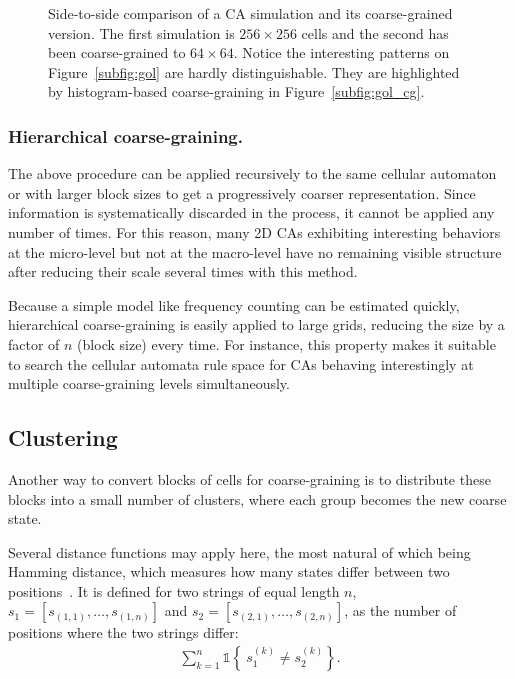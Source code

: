 \begin{figure}[th]
  \caption{\label{fig:gol_comparison} Side-to-side comparison of a CA simulation
    and its coarse-grained version. The first simulation is $256 \times 256$
    cells and the second has been coarse-grained to $64\times 64$. Notice the
    interesting patterns on Figure~\ref{subfig:gol} are hardly distinguishable.
    They are highlighted by histogram-based coarse-graining in
    Figure~\ref{subfig:gol_cg}.}
\end{figure}


\subsubsection{Hierarchical coarse-graining.}
The above procedure can be applied recursively to the same cellular automaton or
with larger block sizes to get a progressively coarser representation. Since
information is systematically discarded in the process, it cannot be applied any
number of times. For this reason, many 2D CAs exhibiting interesting behaviors at
the micro-level but not at the macro-level have no remaining visible structure
after reducing their scale several times with this method.

Because a simple model like frequency counting can be estimated quickly,
hierarchical coarse-graining is easily applied to large grids, reducing the size
by a factor of $n$ (block size) every time. For instance, this property makes it
suitable to search the cellular automata rule space for CAs behaving
interestingly at multiple coarse-graining levels simultaneously.

\subsection{Clustering}

Another way to convert blocks of cells for coarse-graining is to distribute
these blocks into a small number of clusters, where each group becomes the new
coarse state.

Several distance functions may apply here, the most natural of which being
Hamming distance, which measures how many states differ between two
positions~\parencite{hammingErrorDetectingError1950}. It is defined for two strings
of equal length $n$, $s_1 = [s_{(1, 1)}, \ldots, s_{(1,n)}]$ and $s_2 =
[s_{(2,1)}, \ldots, s_{(2,n)}]$, as the number of positions where the two
strings differ:
\begin{align}
  \sum_{k = 1}^n \mathds{1}\left\{\ s_1^{(k)}  \neq s_2^{(k)}\right\}.
\end{align}


